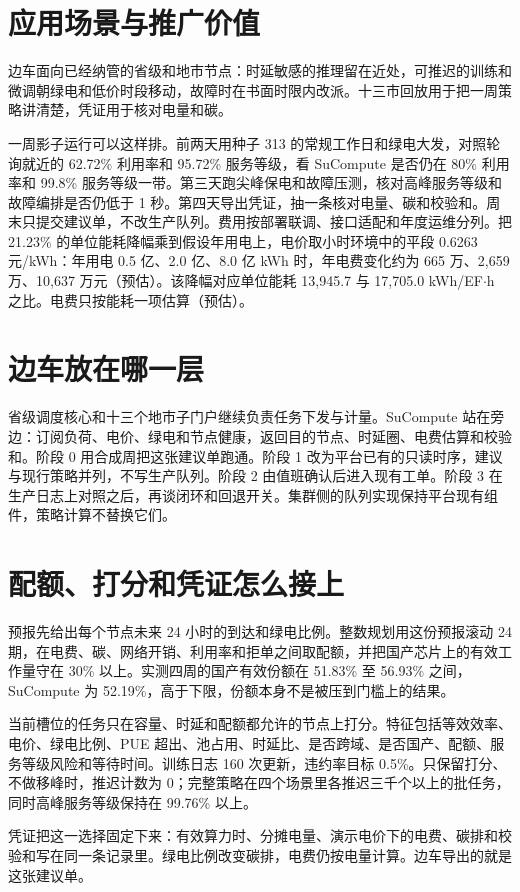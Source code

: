 \section{应用场景与推广价值}
\label{sec:value}
边车面向已经纳管的省级和地市节点：时延敏感的推理留在近处，可推迟的训练和微调朝绿电和低价时段移动，故障时在书面时限内改派。十三市回放用于把一周策略讲清楚，凭证用于核对电量和碳。

一周影子运行可以这样排。前两天用种子 313 的常规工作日和绿电大发，对照轮询就近的 62.72\% 利用率和 95.72\% 服务等级，看 SuCompute 是否仍在 80\% 利用率和 99.8\% 服务等级一带。第三天跑尖峰保电和故障压测，核对高峰服务等级和故障编排是否仍低于 1 秒。第四天导出凭证，抽一条核对电量、碳和校验和。周末只提交建议单，不改生产队列。费用按部署联调、接口适配和年度运维分列。把 21.23\% 的单位能耗降幅乘到假设年用电上，电价取小时环境中的平段 0.6263 元/kWh：年用电 0.5 亿、2.0 亿、8.0 亿 kWh 时，年电费变化约为 665 万、2{,}659 万、10{,}637 万元（预估）。该降幅对应单位能耗 13{,}945.7 与 17{,}705.0 kWh/EF$\cdot$h 之比。电费只按能耗一项估算（预估）。

\section{边车放在哪一层}
省级调度核心和十三个地市子门户继续负责任务下发与计量。SuCompute 站在旁边：订阅负荷、电价、绿电和节点健康，返回目的节点、时延圈、电费估算和校验和。阶段 0 用合成周把这张建议单跑通。阶段 1 改为平台已有的只读时序，建议与现行策略并列，不写生产队列。阶段 2 由值班确认后进入现有工单。阶段 3 在生产日志上对照之后，再谈闭环和回退开关。集群侧的队列实现保持平台现有组件，策略计算不替换它们。

\section{配额、打分和凭证怎么接上}
预报先给出每个节点未来 24 小时的到达和绿电比例。整数规划用这份预报滚动 24 期，在电费、碳、网络开销、利用率和拒单之间取配额，并把国产芯片上的有效工作量守在 30\% 以上。实测四周的国产有效份额在 51.83\% 至 56.93\% 之间，SuCompute 为 52.19\%，高于下限，份额本身不是被压到门槛上的结果。

当前槽位的任务只在容量、时延和配额都允许的节点上打分。特征包括等效效率、电价、绿电比例、PUE 超出、池占用、时延比、是否跨域、是否国产、配额、服务等级风险和等待时间。训练日志 160 次更新，违约率目标 0.5\%。只保留打分、不做移峰时，推迟计数为 0；完整策略在四个场景里各推迟三千个以上的批任务，同时高峰服务等级保持在 99.76\% 以上。

凭证把这一选择固定下来：有效算力时、分摊电量、演示电价下的电费、碳排和校验和写在同一条记录里。绿电比例改变碳排，电费仍按电量计算。边车导出的就是这张建议单。

